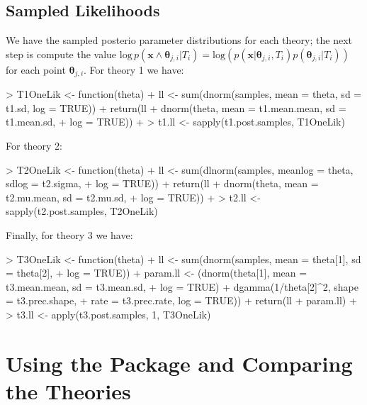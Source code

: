 \documentclass[letterpaper,12pt]{article}
\newcommand{\bx}{\boldsymbol x}
\newcommand{\btheta}{\boldsymbol \theta}%
\begin{document}
\subsection{Sampled Likelihoods}

We have the sampled posterio parameter distributions for each theory;
the next step is compute the value $\mbox{log}\,p(\bx \wedge
\btheta_{j,i} | T_i) = \mbox{log}(p(\bx | \btheta_{j,i},
T_i)p(\btheta_{j,i}|T_i))$ for each point $\btheta_{j,i}$.  For theory
1 we have:

\begin{Schunk}
\begin{Sinput}
> T1OneLik <- function(theta) {
+     ll <- sum(dnorm(samples, mean = theta, sd = t1.sd, log = TRUE))
+     return(ll + dnorm(theta, mean = t1.mean.mean, sd = t1.mean.sd, 
+         log = TRUE))
+ }
> t1.ll <- sapply(t1.post.samples, T1OneLik)
\end{Sinput}
\end{Schunk}

\noindent For theory 2:

\begin{Schunk}
\begin{Sinput}
> T2OneLik <- function(theta) {
+     ll <- sum(dlnorm(samples, meanlog = theta, sdlog = t2.sigma, 
+         log = TRUE))
+     return(ll + dnorm(theta, mean = t2.mu.mean, sd = t2.mu.sd, 
+         log = TRUE))
+ }
> t2.ll <- sapply(t2.post.samples, T2OneLik)
\end{Sinput}
\end{Schunk}

\noindent Finally, for theory 3 we have:

\begin{Schunk}
\begin{Sinput}
> T3OneLik <- function(theta) {
+     ll <- sum(dnorm(samples, mean = theta[1], sd = theta[2], 
+         log = TRUE))
+     param.ll <- (dnorm(theta[1], mean = t3.mean.mean, sd = t3.mean.sd, 
+         log = TRUE) + dgamma(1/theta[2]^2, shape = t3.prec.shape, 
+         rate = t3.prec.rate, log = TRUE))
+     return(ll + param.ll)
+ }
> t3.ll <- apply(t3.post.samples, 1, T3OneLik)
\end{Sinput}
\end{Schunk}

\section{Using the Package and Comparing the Theories}
\label{Compute}
\end{document}
